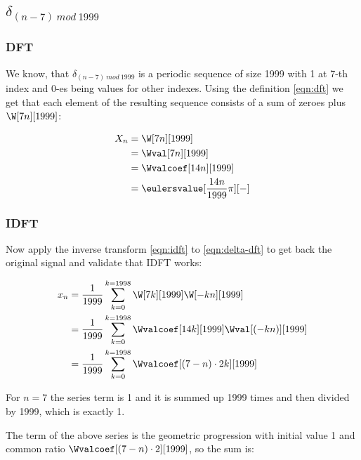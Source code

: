 \documentclass[a4paper]{article}
\theoremstyle{break}
\theoremstyle{break}
\begin{document}
\subsection{$\delta_{(n - 7)\ mod\ 1999}$}

\subsubsection{DFT}

We know, that $\delta_{(n - 7)\ mod\ 1999}$ is a periodic sequence of size 1999 with 1 at 7-th index and 0-es being values for other indexes. Using the definition \eqref{eqn:dft} we get that each element of the resulting sequence consists of a sum of zeroes plus $\W[7n][1999]$:

\begin{equation} \label{eqn:delta-dft}
  \begin{split}
    X_n &= \W[7n][1999] \\
        &= \Wval[7n][1999] \\
        &= \Wvalcoef[14n][1999] \\
        &= \eulersvalue[\frac{14n}{1999}\pi][-]
  \end{split}
\end{equation}

\subsubsection{IDFT}

Now apply the inverse transform \eqref{eqn:idft} to \eqref{eqn:delta-dft} to get back the original signal and validate that IDFT works:

\begin{equation*}
  \begin{split}
    x_n &= \frac{1}{1999} \sum_{k = 0}^{k = 1998} \W[7k][1999] \W[-kn][1999] \\
        &= \frac{1}{1999} \sum_{k = 0}^{k = 1998} \Wvalcoef[14k][1999] \Wval[(-kn)][1999] \\
        &= \frac{1}{1999} \sum_{k = 0}^{k = 1998} \Wvalcoef[(7 - n) \cdot 2k][1999]
  \end{split}
\end{equation*}


For $n = 7$ the series term is 1 and it is summed up 1999 times and then divided by 1999, which is exactly 1.

The term of the above series is the geometric progression with initial value 1 and common ratio $\Wvalcoef[(7 - n) \cdot 2][1999]$, so the sum is:
\end{document}
